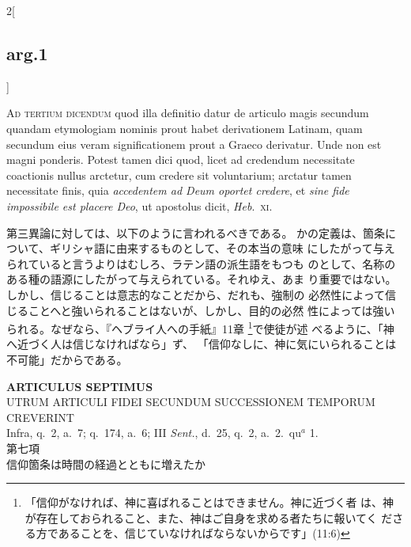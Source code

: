 \documentclass[paper=a4paper,fontsize=10pt,jafontsize=9pt,titlepage]{jlreq}
\begin{document}
\begin{paracol}{2}[\subsection{arg.1}]
\switchcolumn*[\subsection{ad.3}]

{\scshape Ad tertium dicendum} quod illa definitio
datur de articulo magis secundum quandam etymologiam nominis prout habet
derivationem Latinam, quam secundum eius veram significationem prout a
Graeco derivatur. Unde non est magni ponderis. Potest tamen dici quod,
licet ad credendum necessitate coactionis nullus arctetur, cum credere
sit voluntarium; arctatur tamen necessitate finis, quia {\itshape accedentem ad
Deum oportet credere}, et {\itshape sine fide impossibile est placere Deo}, ut
apostolus dicit, {\itshape Heb}.~{\scshape xi}.

\switchcolumn

第三異論に対しては、以下のように言われるべきである。
かの定義は、箇条について、ギリシャ語に由来するものとして、その本当の意味
 にしたがって与えられていると言うよりはむしろ、ラテン語の派生語をもつも
 のとして、名称のある種の語源にしたがって与えられている。それゆえ、あま
 り重要ではない。しかし、信じることは意志的なことだから、だれも、強制の
 必然性によって信じることへと強いられることはないが、しかし、目的の必然
 性によっては強いられる。なぜなら、『ヘブライ人への手紙』11章
 \footnote{「信仰がなければ、神に喜ばれることはできません。神に近づく者
 は、神が存在しておられること、また、神はご自身を求める者たちに報いてく
 ださる方であることを、信じていなければならないからです」(11:6)}で使徒が述
 べるように、「神へ近づく人は信じなければなら」ず、
 「信仰なしに、神に気にいられることは不可能」だからである。

\end{paracol}
\newpage


{}
\setcounter{section}{7}
\setcounter{subsection}{0}
\begin{center}
 {\Large {\bfseries ARTICULUS SEPTIMUS}}\\
 {\large UTRUM ARTICULI FIDEI SECUNDUM SUCCESSIONEM TEMPORUM CREVERINT}\\
 {\footnotesize Infra, q.~2, a.~7; q.~174, a.~6; III {\itshape Sent.},
 d.~25, q.~2, a.~2.~qu$^a$ 1.}\\
 {\Large 第七項\\信仰箇条は時間の経過とともに増えたか}
\end{center}
\end{document}
